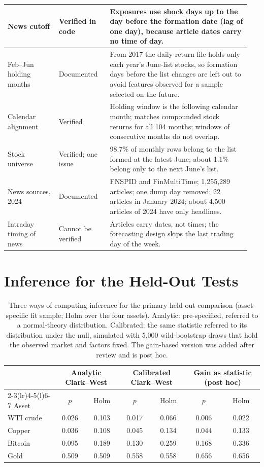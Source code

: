 \documentclass[11pt]{article}
\begin{document}
\begin{longtable}{@{}p{0.2\linewidth}p{0.2\linewidth}p{0.55\linewidth}@{}}
News cutoff & Verified in code & Exposures use shock days up to the day before the formation date (lag of one day), because article dates carry no time of day. \\ \midrule
Feb--Jun holding months & Documented & From 2017 the daily return file holds only each year's June-list stocks, so formation days before the list changes are left out to avoid features observed for a sample selected on the future. \\ \midrule
Calendar alignment & Verified & Holding window is the following calendar month; matches compounded stock returns for all 104 months; windows of consecutive months do not overlap. \\ \midrule
Stock universe & Verified; one issue & 98.7\% of monthly rows belong to the list formed at the latest June; about 1.1\% belong only to the next June's list. \\ \midrule
News sources, 2024 & Documented & FNSPID and FinMultiTime; 1{,}255{,}289 articles; one dump day removed; 22 articles in January 2024; about 4{,}500 articles of 2024 have only headlines. \\ \midrule
Intraday timing of news & Cannot be verified & Articles carry dates, not times; the forecasting design skips the last trading day of the week. \\ \midrule
\bottomrule
\end{longtable}
\normalsize

\section{Inference for the Held-Out Tests}
\label{app:calib}

\begin{table}[h]
\centering\small
\begin{tabular}{@{}lcccccc@{}}
\toprule
 & \multicolumn{2}{c}{Analytic Clark--West} & \multicolumn{2}{c}{Calibrated Clark--West} & \multicolumn{2}{c}{Gain as statistic (post hoc)} \\
\cmidrule(lr){2-3}\cmidrule(lr){4-5}\cmidrule(l){6-7}
Asset & $p$ & Holm & $p$ & Holm & $p$ & Holm \\
\midrule
WTI crude & 0.026 & 0.103 & 0.017 & 0.066 & 0.006 & 0.022 \\
Copper & 0.036 & 0.108 & 0.045 & 0.134 & 0.044 & 0.133 \\
Bitcoin & 0.095 & 0.189 & 0.130 & 0.259 & 0.168 & 0.336 \\
Gold & 0.509 & 0.509 & 0.558 & 0.558 & 0.656 & 0.656 \\
\bottomrule
\end{tabular}
\caption{Three ways of computing inference for the primary held-out comparison (asset-specific fit sample; Holm over the four assets). Analytic: pre-specified, referred to a normal-theory distribution. Calibrated: the same statistic referred to its distribution under the null, simulated with 5{,}000 wild-bootstrap draws that hold the observed market and factors fixed. The gain-based version was added after review and is post hoc.}
\label{tab:calib}
\end{table}
\end{document}
